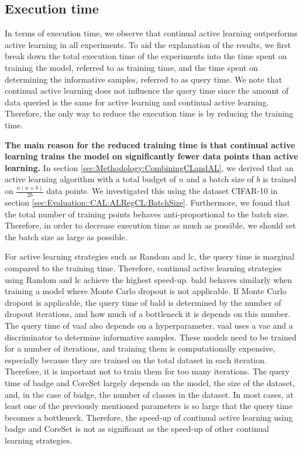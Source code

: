 \subsection{Execution time}
\label{sec:Discussion:ExecutionTime}
In terms of execution time, we observe that continual active learning outperforms active learning in all experiments. To aid the explanation of
the results, we first break down the total execution time of the experiments into the time spent on training the model, referred to as training time,
and the time spent on determining the informative samples, referred to as query time. We note that continual active learning does not influence the 
query time since the amount of data queried is the same for active learning and continual active learning. Therefore, the only way to reduce the
execution time is by reducing the training time. \par
\textbf{The main reason for the reduced training time is that continual active learning trains the model on significantly fewer data points than active learning.}
In section \ref{sec:Methodology:CombiningCLandAL}, we derived that an active learning algorithm with a total budget of $n$ and a batch size of $b$ is
trained on $\frac{n(n+b)}{2b}$ data points. We investigated this using the dataset CIFAR-10 in section \ref{sec:Evaluation::CAL:ALRegCL:BatchSize}.
Furthermore, we found that the total number of training points behaves anti-proportional to the batch size. Therefore, in order to decrease execution
time as much as possible, we should set the batch size as large as possible. \par
For active learning strategies such as Random and \gls{lc}, the query time is marginal compared to the training time. Therefore, continual active learning
strategies using Random and \gls{lc} achieve the highest speed-up. \gls{bald} behaves similarly when training a model where Monte
Carlo dropout is not applicable. If Monte Carlo dropout is applicable, the query time of \gls{bald} is determined by the number of dropout iterations,
and how much of a bottleneck it is depends on this number. The query time of \gls{vaal} also depends on a hyperparameter.
\gls{vaal} uses a \gls{vae} and a discriminator to determine informative samples. These models need to be trained for a number of iterations, and training
them is computationally expensive, especially because they are trained on the total dataset in each iteration. Therefore, it is important not to train
them for too many iterations. The query time of \gls{badge} and CoreSet largely depends on the model, the size of the dataset, and, in the case of
\gls{badge}, the number of classes in the dataset. In most cases, at least one of the previously mentioned parameters is so large that the query time
becomes a bottleneck. Therefore, the speed-up of continual active learning using \gls{badge} and CoreSet is not as significant as the speed-up of other
continual learning strategies. \par

